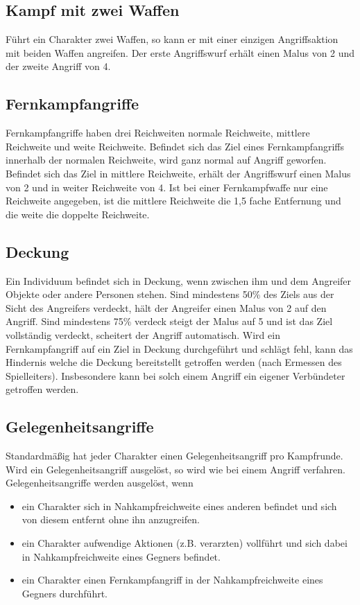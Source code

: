 \documentclass[../../Heldenanleitung2]{subfiles}
\begin{document}
\subsection{Kampf mit zwei Waffen}
Führt ein Charakter zwei Waffen, so kann er mit einer einzigen Angriffsaktion mit beiden Waffen angreifen. Der erste Angriffswurf erhält einen Malus von 2 und der zweite Angriff von 4.

\subsection{Fernkampfangriffe}
Fernkampfangriffe haben drei Reichweiten normale Reichweite, mittlere Reichweite und weite Reichweite. Befindet sich das Ziel eines Fernkampfangriffs innerhalb der normalen Reichweite, wird ganz normal auf Angriff geworfen. Befindet sich das Ziel in mittlere Reichweite, erhält der Angriffswurf einen Malus von 2 und in weiter Reichweite von 4. Ist bei einer Fernkampfwaffe nur eine Reichweite angegeben, ist die mittlere Reichweite die 1,5 fache Entfernung und die weite die doppelte Reichweite.

\subsection{Deckung}
Ein Individuum befindet sich in Deckung, wenn zwischen ihm und dem Angreifer Objekte oder andere Personen stehen. Sind mindestens 50\% des Ziels aus der Sicht des Angreifers verdeckt, hält der Angreifer einen Malus von 2 auf den Angriff. Sind mindestens 75\% verdeck steigt der Malus auf 5 und ist das Ziel vollständig verdeckt, scheitert der Angriff automatisch. Wird ein Fernkampfangriff auf ein Ziel in Deckung durchgeführt und schlägt fehl, kann das Hindernis welche die Deckung bereitstellt getroffen werden (nach Ermessen des Spielleiters). Insbesondere kann bei solch einem Angriff ein eigener Verbündeter getroffen werden.

\subsection{Gelegenheitsangriffe}
Standardmäßig hat jeder Charakter einen Gelegenheitsangriff pro Kampfrunde. Wird ein Gelegenheitsangriff ausgelöst, so wird wie bei einem Angriff verfahren. Gelegenheitsangriffe werden ausgelöst, wenn
\begin{itemize}
	\item ein Charakter sich in Nahkampfreichweite eines anderen befindet und sich von diesem entfernt ohne ihn anzugreifen.
	\item ein Charakter aufwendige Aktionen (z.B. verarzten) vollführt und sich dabei in Nahkampfreichweite eines Gegners befindet.
	\item ein Charakter einen Fernkampfangriff in der Nahkampfreichweite eines Gegners durchführt.
\end{itemize}
\end{document}
